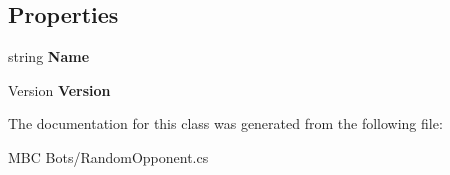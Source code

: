 \subsection*{Properties}
\begin{DoxyCompactItemize}
\item 
\hypertarget{class_m_b_c_1_1_bots_1_1_random_bot_a09a9e4b4ea05bea001bebd2819e49999}{string {\bfseries Name}}\label{class_m_b_c_1_1_bots_1_1_random_bot_a09a9e4b4ea05bea001bebd2819e49999}

\item 
\hypertarget{class_m_b_c_1_1_bots_1_1_random_bot_a32a130d474e7930e1bc2942e5697987f}{Version {\bfseries Version}}\label{class_m_b_c_1_1_bots_1_1_random_bot_a32a130d474e7930e1bc2942e5697987f}

\end{DoxyCompactItemize}


The documentation for this class was generated from the following file\-:\begin{DoxyCompactItemize}
\item 
M\-B\-C Bots/Random\-Opponent.\-cs\end{DoxyCompactItemize}
